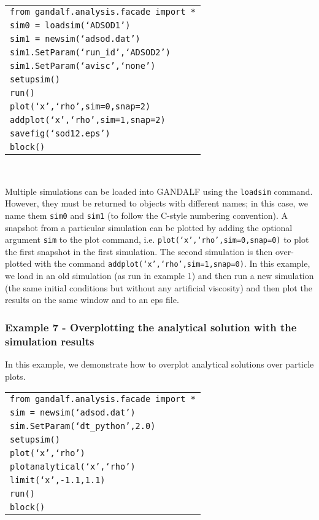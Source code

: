 \documentclass[a4paper]{article}
\newcommand{\var}[1]{\texttt{#1}}
\begin{document}
\begin{tabular}{p{14.0cm}}
\var{from gandalf.analysis.facade import *} \\
\var{sim0 = loadsim(`ADSOD1')} \\
\var{sim1 = newsim(`adsod.dat')} \\
\var{sim1.SetParam(`run\_id',`ADSOD2')} \\
\var{sim1.SetParam(`avisc',`none')} \\
\var{setupsim()} \\
\var{run()} \\
\var{plot(`x',`rho',sim=0,snap=2)} \\
\var{addplot(`x',`rho',sim=1,snap=2)} \\
\var{savefig(`sod12.eps')} \\
\var{block()} \\
\end{tabular} \\
\newline

\noindent Multiple simulations can be loaded into GANDALF using the \var{loadsim} command.  However, they must be returned to objects with different names; in this case, we name them \var{sim0} and \var{sim1} (to follow the C-style numbering convention).  A snapshot from a particular simulation can be plotted by adding the optional argument \var{sim} to the plot command, i.e. \var{plot(`x',`rho',sim=0,snap=0)} to plot the first snapshot in the first simulation.  The second simulation is then over-plotted with the command \var{addplot(`x',`rho',sim=1,snap=0)}.  In this example, we load in an old simulation (as run in example 1) and then run a new simulation (the same initial conditions but without any artificial viscosity) and then plot the results on the same window and to an eps file.


\subsubsection{Example  7 - Overplotting the analytical solution with the simulation results}
In this example, we demonstrate how to overplot analytical solutions over particle plots. \\

\begin{tabular}{p{14.0cm}}
\var{from gandalf.analysis.facade import *} \\
\var{sim = newsim(`adsod.dat')} \\
\var{sim.SetParam(`dt\_python',2.0)} \\
\var{setupsim()} \\
\var{plot(`x',`rho')} \\
\var{plotanalytical(`x',`rho')} \\
\var{limit(`x',-1.1,1.1)} \\
\var{run()} \\
\var{block()} \\
\end{tabular} \\
\newline
\end{document}
